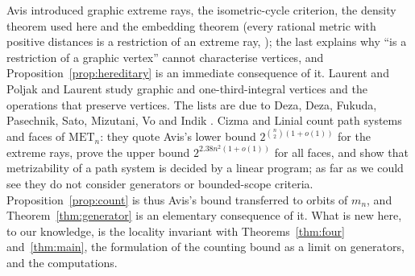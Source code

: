 \documentclass[11pt,a4paper]{article}
\theoremstyle{definition}
\theoremstyle{remark}
\newcommand{\MET}{\mathrm{MET}}
\begin{document}
Avis \cite{A80} introduced graphic extreme rays, the isometric-cycle criterion, the density theorem used here and
the embedding theorem (every rational metric with positive distances is a restriction of an extreme ray,
\cite[Thm 3.5]{A80}); the last
explains why ``is a restriction of a graphic vertex'' cannot characterise vertices, and
Proposition~\ref{prop:hereditary} is an immediate consequence of it. Laurent and Poljak \cite{LP92}
and Laurent \cite{L96} study graphic and one-third-integral vertices and the operations that preserve vertices. The
lists are due to Deza, Deza, Fukuda, Pasechnik, Sato, Mizutani, Vo and Indik \cite{DDF96,DFPS01,DFMV03,DI07}. Cizma
and Linial \cite{CL25} count path systems and faces of $\MET_n$: they quote Avis's lower bound
$2^{\binom n2(1+o(1))}$ for the extreme rays, prove the upper bound $2^{2.38n^2(1+o(1))}$ for all faces, and show
that metrizability of a path system is decided by a linear program; as far as we could see they do not consider
generators or bounded-scope criteria. Proposition~\ref{prop:count} is thus Avis's bound transferred to orbits of
$m_n$, and Theorem~\ref{thm:generator} is an elementary consequence of it. What is new here, to our knowledge, is
the locality invariant with Theorems~\ref{thm:four} and~\ref{thm:main}, the formulation of the counting bound as a
limit on generators, and the computations.
\end{document}
